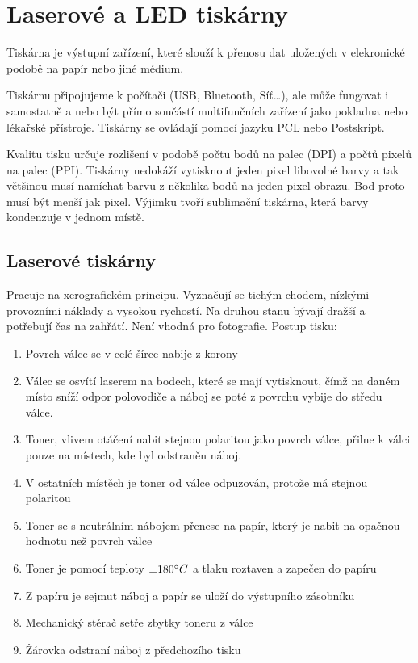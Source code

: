 \section{Laserové a LED tiskárny}
  Tiskárna je výstupní zařízení, které slouží k přenosu dat uložených v elekronické podobě na papír nebo jiné médium.

  Tiskárnu připojujeme k počítači (USB, Bluetooth, Síť\dots), ale může fungovat i samostatně a nebo být přímo součástí multifunčních zařízení jako pokladna nebo lékařské přístroje.
  Tiskárny se ovládají pomocí jazyku PCL nebo Postskript.

  Kvalitu tisku určuje rozlišení v podobě počtu bodů na palec (DPI) a počtů pixelů na palec (PPI).
  Tiskárny nedokáží vytisknout jeden pixel libovolné barvy a tak většinou musí namíchat barvu z několika bodů na jeden pixel obrazu.
  Bod proto musí být menší jak pixel.
  Výjimku tvoří sublimační tiskárna, která barvy kondenzuje v jednom místě.
  \subsection{Laserové tiskárny}
    Pracuje na xerografickém principu.
    Vyznačují se tichým chodem, nízkými provozními náklady a vysokou rychostí.
    Na druhou stanu bývají dražší a potřebují čas na zahřátí.
    Není vhodná pro fotografie.
    Postup tisku:
    \begin{enumerate}
      \item Povrch válce se v celé šírce nabije z korony
      \item Válec se osvítí laserem na bodech, které se mají vytisknout, čímž na daném místo sníží odpor polovodiče a náboj se poté z povrchu vybije do středu válce.
      \item Toner, vlivem otáčení nabit stejnou polaritou jako povrch válce, přilne k válci pouze na místech, kde byl odstraněn náboj.
      \item V ostatních místěch je toner od válce odpuzován, protože má stejnou polaritou
      \item Toner se s neutrálním nábojem přenese na papír, který je nabit na opačnou hodnotu než povrch válce
      \item Toner je pomocí teploty $\pm 180\degree C$ a tlaku roztaven a zapečen do papíru
      \item Z papíru je sejmut náboj a papír se uloží do výstupního zásobníku
      \item Mechanický stěrač setře zbytky toneru z válce
      \item Žárovka odstraní náboj z předchozího tisku
    \end{enumerate}
    
